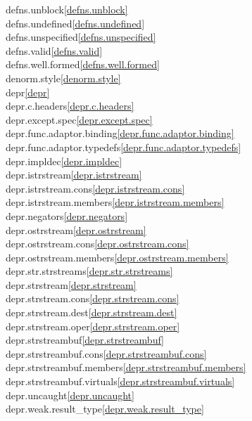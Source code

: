 \begin{multicols}{2}
defns.unblock\quad\ref{defns.unblock}\\
defns.undefined\quad\ref{defns.undefined}\\
defns.unspecified\quad\ref{defns.unspecified}\\
defns.valid\quad\ref{defns.valid}\\
defns.well.formed\quad\ref{defns.well.formed}\\
denorm.style\quad\ref{denorm.style}\\
depr\quad\ref{depr}\\
depr.c.headers\quad\ref{depr.c.headers}\\
depr.except.spec\quad\ref{depr.except.spec}\\
depr.func.adaptor.binding\quad\ref{depr.func.adaptor.binding}\\
depr.func.adaptor.typedefs\quad\ref{depr.func.adaptor.typedefs}\\
depr.impldec\quad\ref{depr.impldec}\\
depr.istrstream\quad\ref{depr.istrstream}\\
depr.istrstream.cons\quad\ref{depr.istrstream.cons}\\
depr.istrstream.members\quad\ref{depr.istrstream.members}\\
depr.negators\quad\ref{depr.negators}\\
depr.ostrstream\quad\ref{depr.ostrstream}\\
depr.ostrstream.cons\quad\ref{depr.ostrstream.cons}\\
depr.ostrstream.members\quad\ref{depr.ostrstream.members}\\
depr.str.strstreams\quad\ref{depr.str.strstreams}\\
depr.strstream\quad\ref{depr.strstream}\\
depr.strstream.cons\quad\ref{depr.strstream.cons}\\
depr.strstream.dest\quad\ref{depr.strstream.dest}\\
depr.strstream.oper\quad\ref{depr.strstream.oper}\\
depr.strstreambuf\quad\ref{depr.strstreambuf}\\
depr.strstreambuf.cons\quad\ref{depr.strstreambuf.cons}\\
depr.strstreambuf.members\quad\ref{depr.strstreambuf.members}\\
depr.strstreambuf.virtuals\quad\ref{depr.strstreambuf.virtuals}\\
depr.uncaught\quad\ref{depr.uncaught}\\
depr.weak.result_type\quad\ref{depr.weak.result_type}\\

\end{multicols}
